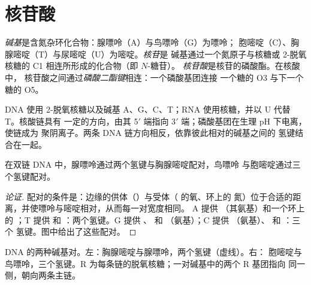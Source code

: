 \section{核苷酸}

\begin{definition}[核苷酸]\label{def:b2:biomolecules:nucleotide}
\emph{碱基}是含氮杂环化合物：腺嘌呤（A）与鸟嘌呤（G）为嘌呤；
胞嘧啶（C）、胸腺嘧啶（T）与尿嘧啶（U）为嘧啶。\emph{核苷}是
碱基通过一个氮原子与核糖或 2-脱氧核糖的 C1 相连所形成的化合物（即 $N$-糖苷）。
\emph{核苷酸}是核苷的磷酸酯。在核酸中，
核苷酸之间通过\emph{磷酸二酯键}相连：一个磷酸基团连接
一个糖的 O3 与下一个糖的 O5。
\end{definition}

DNA 使用 2-脱氧核糖以及碱基 A、G、C、T；RNA 使用核糖，并以 U 代替 T。核酸链具有
一定的方向，由其 5$'$ 端指向 3$'$ 端；磷酸基团在生理 pH 下电离，使链成为
聚阴离子。两条 DNA 链方向相反，依靠彼此相对的碱基之间的
氢键结合在一起。

\begin{proposition}[碱基配对]\label{prop:b2:biomolecules:pairing}
在双链 DNA 中，腺嘌呤通过两个氢键与胸腺嘧啶配对，鸟嘌呤
与胞嘧啶通过三个氢键配对。
\end{proposition}

\begin{proof}[论证]
配对的条件是：边缘的供体（）与受体（ 的氧、环上的
氮）位于合适的距离，并使嘌呤与嘧啶相对，从而每一对宽度相同。
A 提供 （其氨基）和一个环上的 ；T 提供  和 ：两个氢键。G
提供 、 和 （氨基）；C 提供 （氨基）、 和 ：三个
氢键。图中给出了这些配对。
\end{proof}

\begin{omfigure}
%
\hspace{2.3em}%
\hspace{1.5em}
%
\hspace{2.3em}%
\par\vspace{6pt}

{\small DNA 的两种碱基对。左：胸腺嘧啶与腺嘌呤，两个氢键（虚线）。右：
胞嘧啶与鸟嘌呤，三个氢键。R 为每条链的脱氧核糖；一对碱基中的两个 R 基团指向
同一侧，朝向两条主链。}
\end{omfigure}

